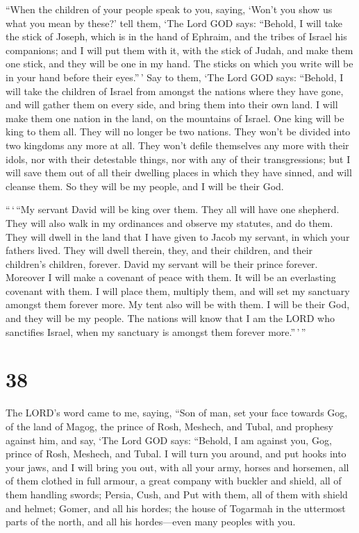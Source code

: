  ``When the children of your people speak to you, saying,
`Won't you show us what you mean by these?'  tell them,
`The Lord GOD says: ``Behold, I will take the stick of Joseph, which is
in the hand of Ephraim, and the tribes of Israel his companions; and I
will put them with it, with the stick of Judah, and make them one stick,
and they will be one in my hand.  The sticks on which you
write will be in your hand before their eyes.''\,'  Say to
them, `The Lord GOD says: ``Behold, I will take the children of Israel
from amongst the nations where they have gone, and will gather them on
every side, and bring them into their own land.  I will
make them one nation in the land, on the mountains of Israel. One king
will be king to them all. They will no longer be two nations. They won't
be divided into two kingdoms any more at all.  They won't
defile themselves any more with their idols, nor with their detestable
things, nor with any of their transgressions; but I will save them out
of all their dwelling places in which they have sinned, and will cleanse
them. So they will be my people, and I will be their God.

 ``\,`\,``My servant David will be king over them. They all
will have one shepherd. They will also walk in my ordinances and observe
my statutes, and do them.  They will dwell in the land that
I have given to Jacob my servant, in which your fathers lived. They will
dwell therein, they, and their children, and their children's children,
forever. David my servant will be their prince forever. 
Moreover I will make a covenant of peace with them. It will be an
everlasting covenant with them. I will place them, multiply them, and
will set my sanctuary amongst them forever more.  My tent
also will be with them. I will be their God, and they will be my people.
 The nations will know that I am the LORD who sanctifies
Israel, when my sanctuary is amongst them forever more.''\,'\,''

\hypertarget{section-36}{%
\section{38}\label{section-36}}

 The LORD's word came to me, saying,  ``Son of
man, set your face towards Gog, of the land of Magog, the prince of
Rosh, Meshech, and Tubal, and prophesy against him,  and
say, `The Lord GOD says: ``Behold, I am against you, Gog, prince of
Rosh, Meshech, and Tubal.  I will turn you around, and put
hooks into your jaws, and I will bring you out, with all your army,
horses and horsemen, all of them clothed in full armour, a great company
with buckler and shield, all of them handling swords; 
Persia, Cush, and Put with them, all of them with shield and helmet;
 Gomer, and all his hordes; the house of Togarmah in the
uttermost parts of the north, and all his hordes---even many peoples
with you.

